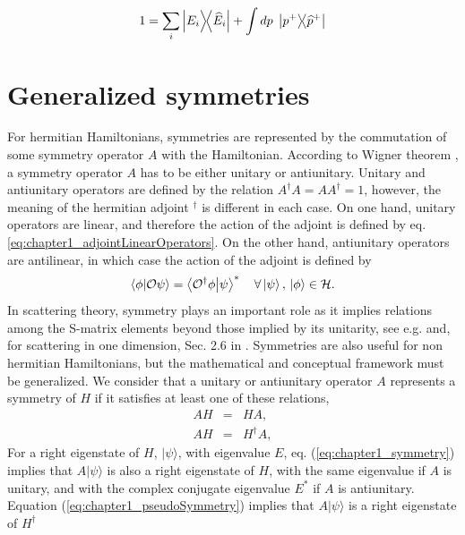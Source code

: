 %
\begin{equation}
  1 = \sum_i \ketbra{E_i}{\widehat{E}_i} + \int dp\; \ketbra{p^+}{\widehat{p}^+}
  \label{eq:chapter1_NonHermitianHamiltonianBasis}
\end{equation}
%

\section{Generalized symmetries}

For hermitian  Hamiltonians, symmetries are represented by the commutation of some symmetry operator $A$ with the Hamiltonian. According to Wigner theorem \cite{Wigner1959}, a symmetry operator $A$ has to be either unitary or antiunitary. Unitary and antiunitary operators are defined by the relation $A^\dagger A = A A^\dagger = 1$, however, the meaning of the hermitian adjoint $^\dagger$ is different in each case. On one hand, unitary operators are linear, and therefore the action of the adjoint is defined by eq. \eqref{eq:chapter1_adjointLinearOperators}. On the other hand, antiunitary operators are antilinear, in which case the action of the adjoint is defined by
%
\begin{equation}
  \braket{\phi}{\mathcal{O}\psi} = \braket{\mathcal{O}^\dagger\phi}{\psi}^*\quad\forall\ket{\psi},\,\ket{\phi}\in\mathcal{H}.
  \label{eq:chapter1_adjointAntiLinearOperators}
\end{equation}
%
In scattering theory, symmetry plays an important role  as it implies relations among
the S-matrix elements beyond those implied by its unitarity, see e.g. \cite{Taylor1972} and, for scattering in one dimension, Sec. 2.6 in \cite{Muga2004}. Symmetries are also useful for  non hermitian Hamiltonians, but the mathematical and conceptual
framework must be generalized. We consider that a unitary or antiunitary operator $A$ represents a symmetry of $H$ if it satisfies at least one of these relations,
%
\begin{eqnarray}
  AH&=&HA,
  \label{eq:chapter1_symmetry}
  \\
  AH&=&H^\dagger A,
  \label{eq:chapter1_pseudoSymmetry}
\end{eqnarray}
%
For a right eigenstate of $H$, $|\psi\rangle$,
with eigenvalue $E$, eq. (\ref{eq:chapter1_symmetry}) implies that
$A|\psi\rangle$ is also a right  eigenstate of $H$, with the
same eigenvalue if $A$ is unitary, and with the complex conjugate eigenvalue $E^*$ if $A$ is antiunitary.
Equation (\ref{eq:chapter1_pseudoSymmetry}) implies that $A|\psi\rangle$ is a right eigenstate of $H^\dagger$
